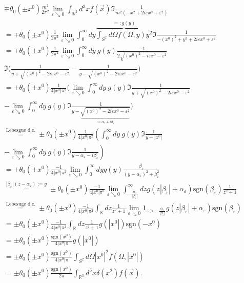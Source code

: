 \documentclass[a4paper,11pt]{article}
\begin{document}
\begin{align}
\mp \theta_0(\pm x^0) \frac{ m^2}{2\pi^2} \lim_{\varepsilon \searrow 0} \int_{\mathbb{R}^3} d^3x f(\vec{x}) \Im \frac{1}{m^2 (-x^2 + 2 i \varepsilon x^0 + \varepsilon^2)}\\
=\mp \theta_0(\pm x^0) \frac{1 }{2\pi^2} \lim_{\varepsilon \searrow 0}\int_0^\infty dy  \overbrace{\int_{S^2} d\Omega f(\Omega, y) y^2}^{=:g(y)} \Im \frac{1}{-(x^0)^2+ y^2 + 2 i \varepsilon x^0 + \varepsilon^2}\\
=\mp \theta_0(\pm x^0) \frac{1 }{2\pi^2} \lim_{\varepsilon \searrow 0}\int_0^\infty dy~ g(y)\frac{-1}{2\sqrt{(x^0)^2-i \varepsilon x^0 - \varepsilon^2}} \\
\Im 
 \Big(\frac{1}{y+ \sqrt{(x^0)^2-2 i \varepsilon x^0 - \varepsilon^2}}-\frac{1}{y- \sqrt{(x^0)^2-2 i \varepsilon x^0 - \varepsilon^2}} \Big)\\
=\pm \theta_0(\pm x^0) \frac{1 }{4 |x^0|\pi^2} 
 \Big(\lim_{\varepsilon \searrow 0}\int_0^\infty dy~ g(y) \Im \frac{1}{y+ \sqrt{(x^0)^2-2 i \varepsilon x^0 - \varepsilon^2}}\\
-\lim_{\varepsilon \searrow 0}\int_0^\infty dy~ g(y) \Im \frac{1}{y- \underbrace{\sqrt{(x^0)^2-2 i \varepsilon x^0 - \varepsilon^2}}_{:= \alpha_\varepsilon + i \beta_\varepsilon}}\Big)\\
\overset{\text{Lebesgue d.c.}}{=}\pm \theta_0(\pm x^0) \frac{1 }{4 |x^0|\pi^2} 
 \left(\int_0^\infty dy~ g(y) \Im \frac{1}{y+|x^0|}\right.\\
\left.-\lim_{\varepsilon \searrow 0}\int_0^\infty dy~ g(y) \Im \frac{1}{y- \alpha_\varepsilon -i \beta_\varepsilon}\right)\\
=\pm \theta_0(\pm x^0) \frac{-1 }{4 |x^0|\pi^2} \lim_{\varepsilon \searrow 0} \int_0^\infty dy g(y) \frac{\beta_\varepsilon}{(y-\alpha_\varepsilon)^2+\beta_\varepsilon^2}\\
\overset{|\beta_\varepsilon|(z-\alpha_\varepsilon) :=y}{=}\pm \theta_0(\pm x^0) \frac{-1 }{4|x^0|\pi^2} 
\lim_{\varepsilon \searrow 0} \int_{-\frac{\alpha_\varepsilon}{|\beta_\varepsilon|}}^\infty dz 
 g(z |\beta_\varepsilon|+\alpha_\varepsilon) \text{sgn}(\beta_\varepsilon) \frac{1}{ z^2+1}\\
 \overset{\text{Lebesuge d.c.}}{=}\pm \theta_0(\pm x^0) \frac{-1 }{4 |x^0|\pi^2} 
\int_\mathbb{R} dz\frac{1}{z^2+1}\lim_{\varepsilon \searrow 0}  1_{z>-\frac{\alpha_\varepsilon}{|\beta_\varepsilon|}} g(z |\beta_\varepsilon|+\alpha_\varepsilon) \text{sgn}(\beta_\varepsilon)\\
=\pm \theta_0(\pm x^0) \frac{-1 }{4 |x^0|\pi^2} \int_\mathbb{R} dz\frac{1}{z^2+1}  g(|x^0|) \text{sgn}(- x^0)\\
=\pm \theta_0(\pm x^0) \frac{\text{sgn}(x^0)}{4|x^0| \pi} g(|x^0|)\\
=\pm \theta_0(\pm x^0) \frac{\text{sgn}(x^0)}{4|x^0| \pi} \int_{S^2} d\Omega |x^0|^2 f(\Omega, |x^0|)\\
=\pm \theta_0(\pm x^0) \frac{\text{sgn}(x^0)}{2 \pi} \int_{\mathbb{R}^3} d^3x \delta(x^2) f(\vec{x}).
\end{align}
\end{document}
